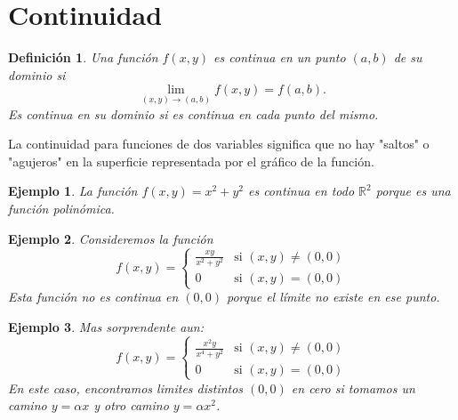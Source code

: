 \documentclass[11pt]{book}
\theoremstyle{definicion}
\theoremstyle{teorema}
\theoremstyle{ejemplo}
\newtheorem{definition}{Definición}
\newtheorem{example}{Ejemplo}
\begin{document}
\section{Continuidad}
\begin{definition}
Una función \( f(x, y) \) es continua en un punto \((a, b)\) de su dominio si
\[ \lim_{(x, y) \to (a, b)} f(x, y) = f(a, b). \]
Es continua en su dominio si es continua en cada punto del mismo.
\end{definition}

La continuidad para funciones de dos variables significa que no hay "saltos" o "agujeros" en la superficie representada por el gráfico de la función.

\begin{example}
La función \( f(x, y) = x^2 + y^2 \) es continua en todo \(\mathbb{R}^2\) porque es una función polinómica.
\end{example}

\begin{example}
Consideremos la función
\[ f(x, y) = \begin{cases}
\frac{xy}{x^2 + y^2} & \text{si } (x, y) \neq (0, 0) \\
0 & \text{si } (x, y) = (0, 0)
\end{cases} \]
Esta función no es continua en \((0, 0)\) porque el límite no existe en ese punto.
\end{example}

\begin{example}
    Mas sorprendente aun:
    \[ f(x, y) = \begin{cases}
\frac{x^2y}{x^4 + y^2} & \text{si } (x, y) \neq (0, 0) \\
0 & \text{si } (x, y) = (0, 0)
\end{cases} \]
En este caso, encontramos limites distintos $(0,0)$ en cero si tomamos un camino $y=\alpha x$ y otro camino $y = \alpha x^2$.
\end{example}





\end{document}
